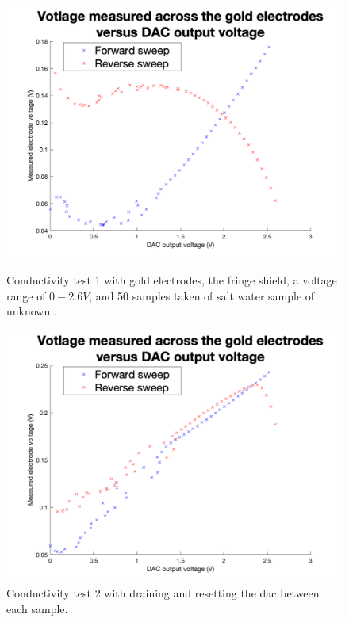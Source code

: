 \begin{figure}[ht]
    \begin{minipage}{0.5\textwidth}
        \centering
        \includegraphics[width=\textwidth]{Figures/Testing/Aus2}
        \caption{Conductivity test 1 with gold electrodes, the fringe shield, a voltage range of $0-2.6V$, and 50 samples taken of salt water sample of unknown .}
        \label{fig:test-test1} %
    \end{minipage}
    \begin{minipage}{0.5\textwidth}
        \centering
        \includegraphics[width=\textwidth]{Figures/Testing/Aus3}
        \caption{Conductivity test 2 with draining and resetting the \gls{dac} between each sample.}
        \label{fig:test-test2} %
    \end{minipage}
\end{figure}

